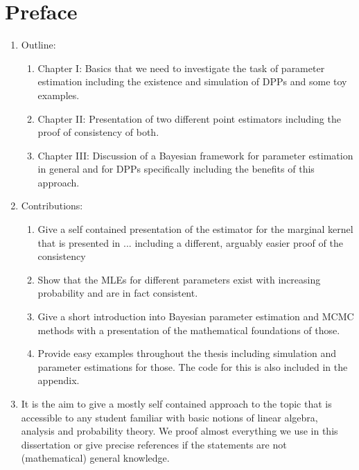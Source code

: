 \chapter*{Preface}





\begin{enumerate}
\item Outline:
\begin{enumerate}
\item Chapter I: Basics that we need to investigate the task of parameter estimation including the existence and simulation of DPPs and some toy examples.
\item Chapter II: Presentation of two different point estimators including the proof of consistency of both.
\item Chapter III: Discussion of a Bayesian framework for parameter estimation in general and for DPPs specifically including the benefits of this approach.
\end{enumerate}
\item Contributions:
\begin{enumerate}
\item Give a self contained presentation of the estimator for the marginal kernel that is presented in ... including a different, arguably easier proof of the consistency
\item Show that the MLEs for different parameters exist with increasing probability and are in fact consistent.
\item Give a short introduction into Bayesian parameter estimation and MCMC methods with a presentation of the mathematical foundations of those.
\item Provide easy examples throughout the thesis including simulation and parameter estimations for those. The code for this is also included in the appendix.
\end{enumerate}
\item It is the aim to give a mostly self contained approach to the topic that is accessible to any student familiar with basic notions of linear algebra, analysis and probability theory. We proof almost everything we use in this dissertation or give precise references if the statements are not (mathematical) general knowledge.
\end{enumerate}